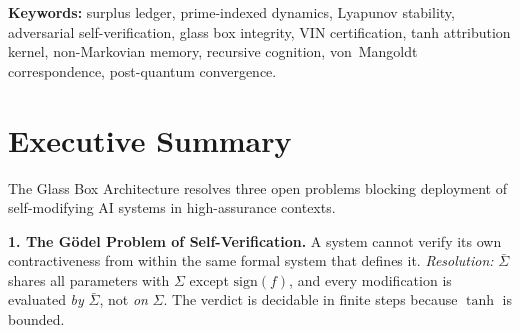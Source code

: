 \documentclass[12pt,letterpaper]{article}
\begin{document}
\begin{abstract}
\noindent
We disclose the \textbf{Glass Box Architecture}: a complete, formally verified
framework for self-modifying recursive cognition systems governed entirely by
two numerical constants $\lambda = 0.97$ and $\beta = 1.0$.
The architecture comprises five coupled components:
(1)~the \emph{$\Sigma$-Kernel}, a tanh-based surplus attribution kernel with
  guaranteed Lyapunov convergence on prime-indexed interaction graphs;
(2)~the \emph{Adversarial Twin $\bar\Sigma$}, a sign-inverted mirror kernel
  initialized from the live surplus ledger that stress-tests every proposed
  self-modification under maximum divergence pressure;
(3)~the \emph{Watchdog}, enforcing a universal drift bound of
  $\Delta_{\mathrm{drift}}\leq 0.03 = 1-\lambda$ with automatic rollback;
(4)~the \emph{Surplus Ledger}, a non-Markovian memory architecture encoding
  interaction history in prime-exponent carry-forward terms; and
(5)~the \emph{Living VIN}, a prime-factored integrity certificate that
  multiplies forward with every certified modification, decomposable by
  arithmetic alone.
All governance parameters derive from $\lambda$ and $\beta$ without additional
configuration. Tamper events activate $\bar\Sigma$ in silent audit mode,
converting hostile modifications into a learning corpus.
The OEM certification path enables open-core extensibility with mathematical
provenance. This disclosure constitutes prior art for all methods described.
\end{abstract}

\noindent\textbf{Keywords:}
surplus ledger, prime-indexed dynamics, Lyapunov stability,
adversarial self-verification, glass box integrity, VIN certification,
tanh attribution kernel, non-Markovian memory, recursive cognition,
von~Mangoldt correspondence, post-quantum convergence.

\tableofcontents\clearpage

\section{Executive Summary}\label{sec:exec}

The Glass Box Architecture resolves three open problems blocking
deployment of self-modifying AI systems in high-assurance contexts.

\textbf{1. The G\"{o}del Problem of Self-Verification.}
A system cannot verify its own contractiveness from within the same
formal system that defines it.
\emph{Resolution:} $\bar\Sigma$ shares all parameters with $\Sigma$
except $\mathrm{sign}(f)$, and every modification is evaluated
\emph{by} $\bar\Sigma$, not \emph{on} $\Sigma$.
The verdict is decidable in finite steps because $\tanh$ is bounded.
\end{document}
